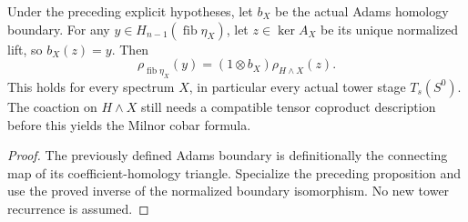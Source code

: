 \begin{proposition}
  \label{prop:h6-next-stage-coaction}
  \leanok
  Under the preceding explicit hypotheses, let $b_X$ be the actual Adams
  homology boundary. For any $y\in H_{n-1}(\operatorname{fib}\eta_X)$,
  let $z\in\ker A_X$ be its unique normalized lift, so $b_X(z)=y$.
  Then
  \[
    \rho_{\operatorname{fib}\eta_X}(y)
       =(1\otimes b_X)\rho_{H\wedge X}(z).
  \]
  This holds for every spectrum $X$, in particular every actual tower
  stage $T_s(S^0)$. The coaction on $H\wedge X$ still needs a compatible
  tensor coproduct description before this yields the Milnor cobar formula.
\end{proposition}
\begin{proof}
  The previously defined Adams boundary is definitionally the connecting
  map of its coefficient-homology triangle. Specialize the preceding
  proposition and use the proved inverse of the normalized boundary
  isomorphism. No new tower recurrence is assumed.
  \leanok
\end{proof}

